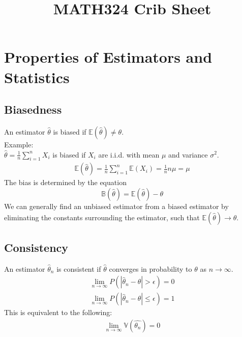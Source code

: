 \documentclass[sn-mathphys,Numbered]{sn-jnl}%
\newcommand{\Var}{\mathbb{V}}
\newcommand{\E}{\mathbb{E}}
\newcommand{\Bias}{\mathbb{B}}
\begin{document}
\title[MATH324]{MATH324 Crib Sheet}

\author{ }

\maketitle
\newpage

\section{Properties of Estimators and Statistics}
\subsection{Biasedness}\label{biasedness}
An estimator $\hat{\theta}$ is biased if $\E(\hat{\theta}) \neq \theta$.\\
Example:\\ $\hat{\theta} = \frac{1}{n} \sum_{i=1}^n X_i$ is biased if $X_i$ are
i.i.d. with mean $\mu$ and variance $\sigma^2$.
\begin{align}
    \E ( \hat{\theta} ) = \frac{1}{n} \sum_{i=1}^n \E (X_i
    ) = \frac{1}{n} n \mu = \mu
\end{align}
The bias is determined by the equation
\begin{equation}
    \Bias ( \hat{\theta} ) = \E ( \hat{\theta} ) - \theta
\end{equation}
We can generally find an unbiased estimator from a biased estimator by eliminating
the constants surrounding the estimator, such that $\E(\hat{\theta}) \to \theta$.

\subsection{Consistency}\label{consistency}
An estimator $\hat{\theta}_n$ is consistent if $\hat{\theta}$ converges in
probability to $\theta$ as $n \rightarrow \infty$.
\begin{align}
    \lim_{n \rightarrow \infty} P(|\hat{\theta}_n - \theta| > \epsilon) = 0 \\
    \lim_{n \rightarrow \infty} P(|\hat{\theta}_n - \theta| \leq \epsilon) = 1
\end{align}
This is equivalent to the following:
\begin{align}
    \lim_{n \to \infty} \Var ( \hat{\theta_n} ) = 0
\end{align}
\end{document}
